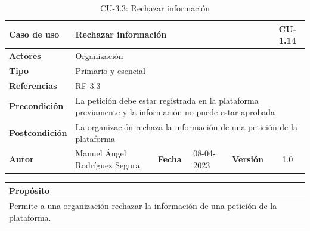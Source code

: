 \begin{table}[H]
    \begin{center}
        \begin{adjustbox}{width=\textwidth}
            \begin{tabular}{ | l | l | l | l | c | c | }
                \hline
                \textbf{Caso de uso} & \multicolumn{4}{l|}{Rechazar información} & \cellcolor{gray!50} \textbf{CU-1.14}\\
                \hline
                \textbf{Actores} & \multicolumn{5}{p{0.5\linewidth}|}{Organización} \\
                \hline
                \textbf{Tipo} & \multicolumn{5}{l|}{Primario y esencial} \\
                \hline
                \textbf{Referencias} & \multicolumn{3}{l|}{RF-3.3} & \multicolumn{2}{l|}{ }\\
                \hline
                \textbf{Precondición} & \multicolumn{5}{l|}{La petición debe estar registrada en la plataforma previamente y
                la información no puede estar aprobada} \\
                \hline
                \textbf{Postcondición} & \multicolumn{5}{l|}{La organización rechaza la información de una petición de la plataforma} \\
                \hline
                \textbf{Autor} & \multicolumn{1}{p{0.25\linewidth}|}{Manuel Ángel Rodríguez Segura} & \textbf{Fecha} &
                08-04-2023     & \textbf{Versión}                                                      & 1.0\\
                \hline
            \end{tabular}
        \end{adjustbox}
        \caption{CU-3.3: Rechazar información}
        \label{tab:rechazar-informacion}
    \end{center}
\end{table}

\begin{table}[H]
    \centering
    \begin{tabularx}{\textwidth}{@{} |L |@{}} \hline
        \textbf{Propósito} \\
        \hline
        Permite a una organización rechazar la información de una petición de la plataforma. \\
        \hline
    \end{tabularx}
\end{table}

